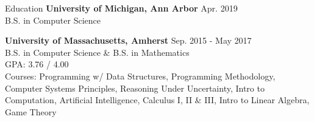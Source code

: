 \documentclass{resume} %
\begin{document}
	
	

	\begin{rSection}{Education}
		{\bf University of Michigan, Ann Arbor} \hfill {Apr. 2019} \\ 
		B.S. in Computer Science
		
		{\bf University of Massachusetts, Amherst} \hfill {Sep. 2015 - May 2017} \\ 
		B.S. in Computer Science \& B.S. in Mathematics \\
		GPA: 3.76 / 4.00 \smallskip \\
		Courses: Programming w/ Data Structures, Programming Methodology, Computer Systems Principles, Reasoning Under Uncertainty, Intro to Computation, Artificial Intelligence, Calculus I, II \& III, Intro to Linear Algebra, Game Theory
	\end{rSection}
	
	
	
	
\end{document}
